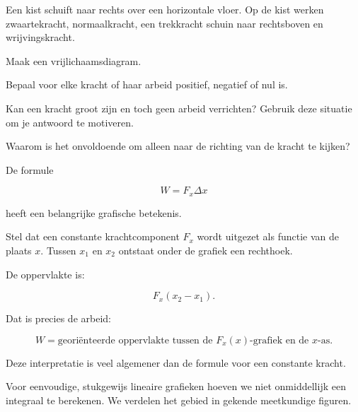 \documentclass{ximera}
\begin{document}
\begin{oefening}{\oefU\ESS}

Een kist schuift naar rechts over een horizontale vloer. Op de kist werken
zwaartekracht, normaalkracht, een trekkracht schuin naar rechtsboven en
wrijvingskracht.

\begin{question}
Maak een vrijlichaamsdiagram.
\end{question}

\begin{question}
Bepaal voor elke kracht of haar arbeid positief, negatief of nul is.
\end{question}

\begin{question}
Kan een kracht groot zijn en toch geen arbeid verrichten? Gebruik deze
situatie om je antwoord te motiveren.
\end{question}

\begin{question}
Waarom is het onvoldoende om alleen naar de richting van de kracht te kijken?
\end{question}

\end{oefening}



De formule

\[
W=F_x\Delta x
\]

heeft een belangrijke grafische betekenis.

Stel dat een constante krachtcomponent $F_x$ wordt uitgezet als functie van
de plaats $x$. Tussen $x_1$ en $x_2$ ontstaat onder de grafiek een rechthoek.

De oppervlakte is:

\[
F_x(x_2-x_1).
\]

Dat is precies de arbeid:

\[
\boxed{
W=\text{georiënteerde oppervlakte tussen de }F_x(x)\text{-grafiek en de }x\text{-as}.
}
\]

Deze interpretatie is veel algemener dan de formule voor een constante kracht.



Voor eenvoudige, stukgewijs lineaire grafieken hoeven we niet onmiddellijk
een integraal te berekenen. We verdelen het gebied in gekende meetkundige
figuren.
\end{document}
